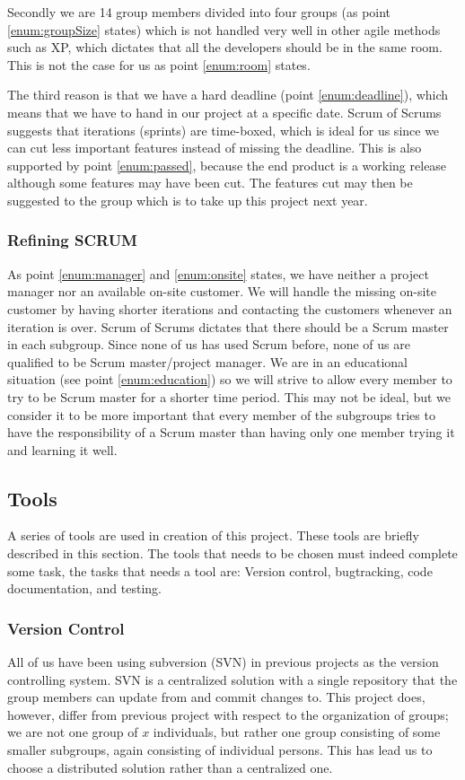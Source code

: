 Secondly we are 14 group members divided into four groups (as point \ref{enum:groupSize} states) which is not handled very well in other agile methods such as XP, which dictates that all the developers should be in the same room. 
This is not the case for us as point \ref{enum:room} states.

The third reason is that we have a hard deadline (point \ref{enum:deadline}), which means that we have to hand in our project at a specific date.
Scrum of Scrums suggests that iterations (sprints) are time-boxed, which is ideal for us since we can cut less important features instead of missing the deadline.
This is also supported by point \ref{enum:passed}, because the end product is a working release although some features may have been cut.
The features cut may then be suggested to the group which is to take up this project next year.


\subsubsection{Refining SCRUM}
As point \ref{enum:manager} and \ref{enum:onsite} states, we have neither a project manager nor an available on-site customer.
We will handle the missing on-site customer by having shorter iterations and contacting the customers whenever an iteration is over.
Scrum of Scrums dictates that there should be a Scrum master in each subgroup.
Since none of us has used Scrum before, none of us are qualified to be Scrum master/project manager.
We are in an educational situation (see point \ref{enum:education}) so we will strive to allow every member to try to be Scrum master for a shorter time period.
This may not be ideal, but we consider it to be more important that every member of the subgroups tries to have the responsibility of a Scrum master than having only one member trying it and learning it well.

\subsection{Tools}
A series of tools are used in creation of this project.
These tools are briefly described in this section.
The tools that needs to be chosen must indeed complete some task, the tasks that needs a tool are: Version control, bugtracking, code documentation, and testing.

\subsubsection{Version Control}
All of us have been using subversion (SVN) in previous projects as the version controlling system.
SVN is a centralized solution \cite{subversion} with a single repository that the group members can update from and commit changes to.
This project does, however, differ from previous project with respect to the organization of groups; we are not one group of $x$ individuals, but rather one group consisting of some smaller subgroups, again consisting of individual persons.
This has lead us to choose a distributed solution rather than a centralized one.

